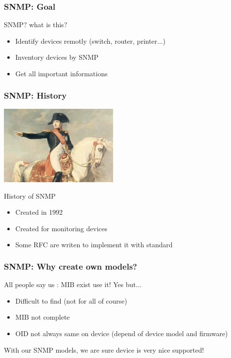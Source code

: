 \documentclass{beamer}
\begin{document}
\begin{frame}
    \frametitle{SNMP: Goal}

    \begin{block}{SNMP? what is this?}
    \begin{itemize}
    \item Identify devices remotly (switch, router, printer...)
    \item Inventory devices by SNMP
    \item Get all important informations
    \end{itemize}
    \end{block}
\end{frame}

\begin{frame}
    \frametitle{SNMP: History}

    \begin{center}
    \includegraphics[height=4.0cm]{pics/napoleon.jpg}
    \end{center}

    \begin{block}{History of SNMP}
    \begin{itemize}
    \item Created in 1992
    \item Created for monitoring devices
    \item Some RFC are writen to implement it with standard
    \end{itemize}
    \end{block}
\end{frame}

\begin{frame}
    \frametitle{SNMP: Why create own models?}

    \begin{block}{All people say us : MIB exist use it!}
    Yes but...
    \begin{itemize}
    \item Difficult to find (not for all of course)
    \item MIB not complete
    \item OID not always same on device (depend of device model and firmware)
    \end{itemize}
    \end{block}

    \begin{block}{With our SNMP models, we are sure device is very nice supported!}
    \end{block}
    
\end{frame}
\end{document}
